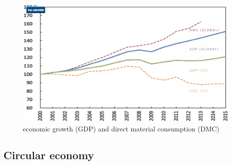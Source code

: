 \documentclass[../summary.tex]{subfiles}
\begin{document}
	\begin{figure}[H]
		\centering
		\includegraphics[width=0.8\linewidth]{../images/5-GDP-DMC-GLOBAL-EU}
		\caption{economic growth (GDP) and direct material consumption (DMC)}
		\label{fig:5-gdp-dmc-global-eu}
	\end{figure}
	
	\newpage
	\subsection{Circular economy}
	
\end{document}
